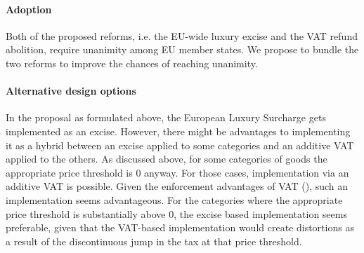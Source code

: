 \documentclass[../../main]{subfiles}
\begin{document}

\paragraph{Adoption} %

Both of the proposed reforms, i.e. the EU-wide luxury excise and the VAT refund abolition, require unanimity among EU member states. We propose to bundle the two reforms to improve the chances of reaching unanimity.

\paragraph{Alternative design options}

In the proposal as formulated above, the European Luxury Surcharge gets implemented as an excise. However, there might be advantages to implementing it as a hybrid between an excise applied to some categories and an additive VAT applied to the others. As discussed above, for some categories of goods the appropriate price threshold is 0 anyway. For those cases, implementation via an additive VAT is possible. Given the enforcement advantages of VAT (\citet{pomeranz2015no}), such an implementation seems advantageous. For the categories where the appropriate price threshold is substantially above 0, the excise based implementation seems preferable, given that the VAT-based implementation would create distortions as a result of the discontinuous jump in the tax at that price threshold.   %





\end{document}
